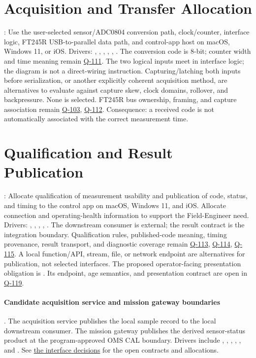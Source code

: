 \section{Acquisition and Transfer Allocation}
: Use the user-selected sensor/ADC0804 conversion path, clock/counter, interface logic, FT245R USB-to-parallel data path, and control-app host on macOS, Windows 11, or iOS. Drivers: , , , , , . The conversion code is 8-bit; counter width and time meaning remain \hyperref[Question:Q-111]{Q-111}. The two logical inputs meet in interface logic; the diagram is not a direct-wiring instruction. Capturing/latching both inputs before serialization, or another explicitly coherent acquisition method, are alternatives to evaluate against capture skew, clock domains, rollover, and backpressure. None is selected. FT245R bus ownership, framing, and capture association remain \hyperref[Question:Q-103]{Q-103}, \hyperref[Question:Q-112]{Q-112}. Consequence: a received code is not automatically associated with the correct measurement time.

\section{Qualification and Result Publication}
: Allocate qualification of measurement usability and publication of code, status, and timing to the control app on macOS, Windows 11, and iOS. Allocate connection and operating-health information to support the Field-Engineer need. Drivers: , , , , . The downstream consumer is external; the result contract is the integration boundary. Qualification rules, published-code meaning, timing provenance, result transport, and diagnostic coverage remain \hyperref[Question:Q-113]{Q-113}, \hyperref[Question:Q-114]{Q-114}, \hyperref[Question:Q-115]{Q-115}. A local function/API, stream, file, or network endpoint are alternatives for publication, not selected interfaces. The proposed operator-facing presentation obligation is . Its endpoint, age semantics, and presentation contract are open in \hyperref[Question:Q-119]{Q-119}.


\paragraph{Candidate acquisition service and mission gateway boundaries}
. The acquisition service publishes the local
sample record to the local downstream consumer. The mission gateway
publishes the derived sensor-status product at the program-approved OMS
CAL boundary. Drivers include ,
, ,
, , and
. See
\hyperref[Table:SampleExchangeBoundaries]{the interface decisions} for the
open contracts and allocations.

